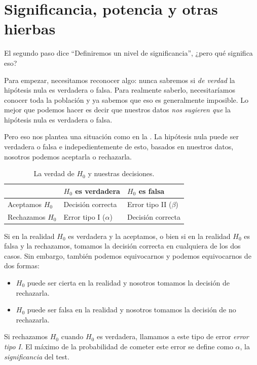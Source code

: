 \informal
\section{Significancia, potencia y otras hierbas}

El segundo paso dice \enquote{Definiremos un nivel de significancia}, ¿pero qué significa eso?

Para empezar, necesitamos reconocer algo: nunca sabremos si \emph{de verdad} la hipótesis nula es verdadera o falsa. Para realmente saberlo, necesitaríamos conocer toda la población y ya sabemos que eso es generalmente imposible. Lo mejor que podemos hacer es decir que nuestros datos \emph{nos sugieren que} la hipótesis nula es verdadera o falsa.

Pero eso nos plantea una situación como en la . La hipótesis nula puede ser verdadera o falsa e indepedientemente de esto, basados en nuestros datos, nosotros podemos aceptarla o rechazarla.

\begin{table}[ht]
  \centering
  \begin{tabular}{>{\raggedright\arraybackslash}m{2.5cm}>{\centering\arraybackslash}m{1.5cm}>{\centering\arraybackslash}m{1.5cm}}
    & \(H_0\) es verdadera & \(H_0\) es falsa \\
    \midrule
    Aceptamos \(H_0\) & Decisión correcta         & Error tipo II (\(\beta\)) \\\midrule
    Rechazamos \(H_0\) & Error tipo I (\(\alpha\)) & Decisión correcta \\
  \end{tabular}
  \caption{La verdad de \(H_0\) y nuestras decisiones.}
\end{table}

Si en la realidad \(H_0\) es verdadera y la aceptamos, o bien si en la realidad \(H_0\) es falsa y la rechazamos, tomamos la decisión correcta en cualquiera de los dos casos. Sin embargo, también podemos equivocarnos y podemos equivocarnos de dos formas:
\begin{itemize}
\item \(H_0\) puede ser cierta en la realidad y nosotros tomamos la decisión de rechazarla.
\item \(H_0\) puede ser falsa en la realidad y nosotros tomamos la decisión de no rechazarla.
\end{itemize}

Si rechazamos \(H_0\) cuando \(H_0\) es verdadera, llamamos a este tipo de error \emph{error tipo I.} El máximo de la probabilidad de cometer este error se define como \(\alpha\), la \emph{significancia} del test.

